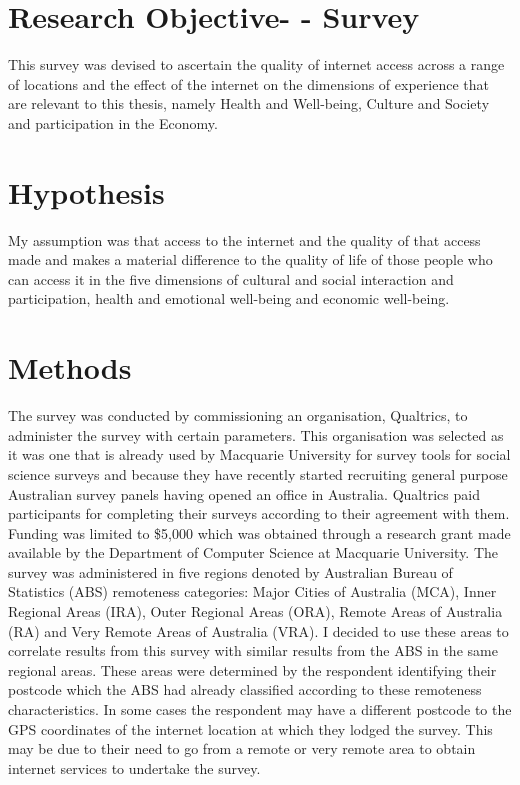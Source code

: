 \section{Research Objective- - Survey}
This survey was devised to ascertain the quality of internet access across a range of locations and the effect of the internet on the dimensions of experience that are relevant to this thesis, namely Health and Well-being, Culture and Society and participation in the Economy. 
\section{Hypothesis}
My assumption was that access to the internet and the quality of that access made and makes a material difference to the quality of life of those people who can access it in the five dimensions of cultural and social interaction and participation, health and emotional well-being and economic well-being.
\section{Methods}
The survey was conducted by commissioning an organisation,  Qualtrics, to administer the survey with certain parameters. This organisation was selected as it was one that is already used by Macquarie University for survey tools for social science surveys and because they have recently started recruiting general purpose Australian survey panels having opened an office in Australia. Qualtrics paid participants for completing their surveys according to their agreement with them. Funding was limited to \$5,000 which was obtained through a research grant made available by the Department of Computer Science at Macquarie University. The survey was administered in five regions denoted by Australian Bureau of Statistics (ABS) remoteness categories: Major Cities of Australia (MCA), Inner Regional Areas (IRA), Outer Regional Areas (ORA), Remote Areas of Australia (RA) and Very Remote Areas of Australia (VRA). I decided to use these areas to correlate results from this survey with similar results from the ABS in the same regional areas. These areas were determined by the respondent identifying their postcode which the ABS had already classified according to these remoteness characteristics. In some cases the respondent may have a different postcode to the GPS coordinates of the internet location at which they lodged the survey. This may be due to their need to go from a remote or very remote area to obtain internet services to undertake the survey.

